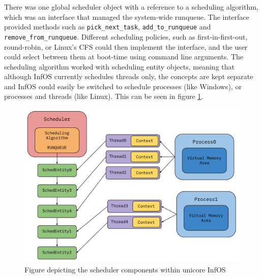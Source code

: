 \documentclass[bsc,frontabs,singlespacing,parskip,deptreport]{infthesis}
\begin{document}
There was one global scheduler object with a reference to a scheduling algorithm, which was an interface that managed the system-wide runqueue. The interface provided methods such as \verb|pick_next_task|, \verb|add_to_runqueue| and \verb|remove_from_runqueue|. Different scheduling policies, such as first-in-first-out, round-robin, or Linux's CFS could then implement the interface, and the user could select between them at boot-time using command line arguments. The scheduling algorithm worked with scheduling entity objects, meaning that although InfOS currently schedules threads only, the concepts are kept separate and InfOS could easily be switched to schedule processes (like Windows), or processes and threads (like Linux). This can be seen in figure \ref{schedulers}.

\begin{figure}[h]
    \centering
    \includegraphics[scale=0.7]{figures/schedulers.pdf}
    \caption{Figure depicting the scheduler components within unicore InfOS}
    \label{schedulers}
\end{figure}
\end{document}
